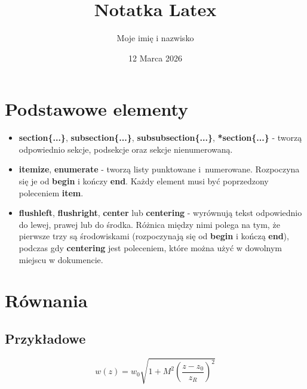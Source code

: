 \documentclass[a4paper,11pt,twocolumn]{article}
\title{Notatka Latex}
\author{Moje imię i nazwisko}
\date{12 Marca 2026}
\begin{document}

\section{Podstawowe elementy}
\begin{itemize}
        \item \textbf{section\{...\}}, \textbf{subsection\{...\}},  \textbf{subsubsection\{...\}}, \textbf{*section\{...\}} - tworzą odpowiednio sekcje, podsekcje oraz sekcje nienumerowaną.
        \item \textbf{itemize}, \textbf{enumerate} - tworzą listy punktowane i~numerowane. Rozpoczyna się je od \textbf{begin} i kończy \textbf{end}. Każdy element musi być poprzedzony poleceniem \textbf{item}.
        \item \textbf{flushleft}, \textbf{flushright}, \textbf{center} lub \textbf{centering} - wyrównują tekst odpowiednio do lewej, prawej lub do środka. Różnica między nimi polega na tym, że pierwsze trzy są środowiskami (rozpoczynają się od \textbf{begin} i kończą \textbf{end}), podczas gdy \textbf{centering} jest poleceniem, które można użyć w dowolnym miejscu w dokumencie.
\end{itemize}

\section{Równania}
\subsection{Przykładowe}
\begin{equation}
    w(z) = w_0 \sqrt{1+ M^2(\frac{z-z_0}{z_R})^2}
\end{equation}
\end{document}
